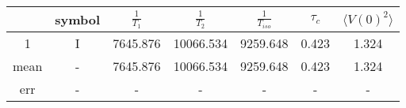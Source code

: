 \begin{tabular}{ccccccc}
\toprule
 & symbol & $\frac{1}{T_{1}}$ & $\frac{1}{T_{2}}$ & $\frac{1}{T_{iso}}$ & $\tau_{c}$ & $\langle V(0)^2\rangle$ \\
\midrule
1 & I & 7645.876 & 10066.534 & 9259.648 & 0.423 & 1.324 \\
mean & - & 7645.876 & 10066.534 & 9259.648 & 0.423 & 1.324 \\
err & - & - & - & - & - & - \\
\bottomrule
\end{tabular}
